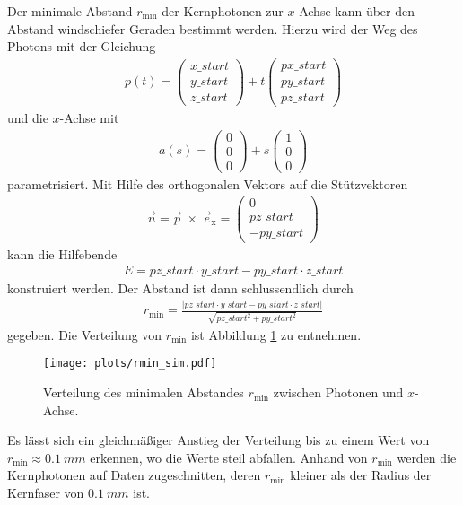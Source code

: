 Der minimale Abstand $r_\mathrm{min}$ der Kernphotonen zur $x$-Achse kann über den Abstand windschiefer Geraden bestimmt werden. Hierzu wird der Weg des Photons mit der Gleichung 
\begin{align}
    p(t) = \left(\begin{array}{c} x\_start \\ y\_start \\ z\_start \end{array}\right)
        + t \left(\begin{array}{c} px\_start \\ py\_start \\ pz\_start \end{array}\right)
\end{align}
und die $x$-Achse mit 
\begin{align}
    a(s) = \left(\begin{array}{c} 0 \\ 0 \\ 0 \end{array}\right)
        + s \left(\begin{array}{c} 1 \\ 0 \\ 0 \end{array}\right)
\end{align}
parametrisiert. 
Mit Hilfe des orthogonalen Vektors auf die Stützvektoren
\begin{align}
    \vec{n} = \vec{p}\; \times \; \vec{e}_\mathrm{x} = \left(\begin{array}{c} 0 \\ pz\_start \\ -py\_start \end{array}\right)
\end{align}
kann die Hilfebende
\begin{align}
    E = pz\_start \cdot y\_start - py\_start \cdot z\_start
\end{align}
konstruiert werden. Der Abstand ist dann schlussendlich durch 
\begin{align}
    r_\mathrm{min} = \frac{|pz\_start \cdot y\_start - py\_start \cdot z\_start|}{\sqrt{pz\_start ^2 + py\_start^2}}
\end{align}
gegeben. Die Verteilung von $r_\mathrm{min}$ ist Abbildung \ref{fig:rmin_sim} zu entnehmen. 
\begin{figure}
    \centering
    \texttt{[image: plots/rmin\_sim.pdf]}
    \caption{Verteilung des minimalen Abstandes $r_\mathrm{min}$ zwischen Photonen und $x$-Achse.}
    \label{fig:rmin_sim}
\end{figure} 
\FloatBarrier
Es lässt sich ein gleichmäßiger Anstieg der Verteilung bis zu einem Wert von $r_\mathrm{min} \approx \SI{0.1}{mm}$ erkennen, wo die Werte steil abfallen.
Anhand von $r_\mathrm{min}$ werden die Kernphotonen auf Daten zugeschnitten, deren $r_\mathrm{min}$ kleiner als der Radius der Kernfaser von $\SI{0.1}{mm}$ ist.\\


